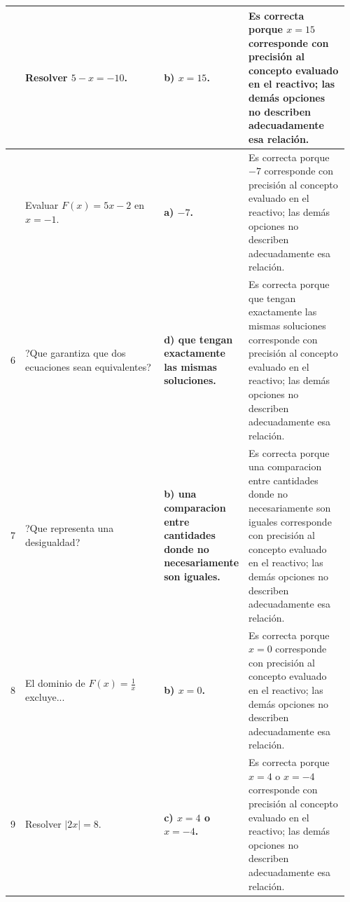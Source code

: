 \documentclass[
	spanish,
	letterpaper, oneside
]{article}
\begin{document}
\begin{landscape}
\begin{longtable}{@{}>{\centering\arraybackslash}p{0.035\linewidth}>{\raggedright\arraybackslash}p{0.42\linewidth}>{\raggedright\arraybackslash}p{0.20\linewidth}>{\raggedright\arraybackslash}p{0.30\linewidth}@{}}
\midrule
4 & Resolver $5-x=-10$. & \textbf{b) $x=15$.} & Es correcta porque $x=15$ corresponde con precisión al concepto evaluado en el reactivo; las demás opciones no describen adecuadamente esa relación. \\
\midrule
5 & Evaluar $F(x)=5x-2$ en $x=-1$. & \textbf{a) $-7$.} & Es correcta porque $-7$ corresponde con precisión al concepto evaluado en el reactivo; las demás opciones no describen adecuadamente esa relación. \\
\midrule
6 & ?Que garantiza que dos ecuaciones sean equivalentes? & \textbf{d) que tengan exactamente las mismas soluciones.} & Es correcta porque que tengan exactamente las mismas soluciones corresponde con precisión al concepto evaluado en el reactivo; las demás opciones no describen adecuadamente esa relación. \\
\midrule
7 & ?Que representa una desigualdad? & \textbf{b) una comparacion entre cantidades donde no necesariamente son iguales.} & Es correcta porque una comparacion entre cantidades donde no necesariamente son iguales corresponde con precisión al concepto evaluado en el reactivo; las demás opciones no describen adecuadamente esa relación. \\
\midrule
8 & El dominio de $F(x)=\frac{1}{x}$ excluye... & \textbf{b) $x=0$.} & Es correcta porque $x=0$ corresponde con precisión al concepto evaluado en el reactivo; las demás opciones no describen adecuadamente esa relación. \\
\midrule
9 & Resolver $|2x|=8$. & \textbf{c) $x=4$ o $x=-4$.} & Es correcta porque $x=4$ o $x=-4$ corresponde con precisión al concepto evaluado en el reactivo; las demás opciones no describen adecuadamente esa relación. \\
\midrule

\end{longtable}
\end{landscape}
\end{document}
